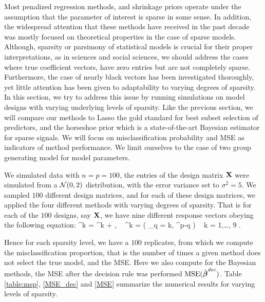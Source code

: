 \documentclass[ba]{imsart}
\begin{document}
Most penalized regression methods, and shrinkage priors operate under the assumption that the parameter of interest is sparse in some sense. In addition, the widespread attention that these methods have received in the past decade was mostly focused on theoretical properties in the case of sparse models. Although, sparsity or parsimony of statistical models is crucial for their proper interpretations, as in sciences
and social sciences, we should address the cases where true coefficient vectors, have zero entries but are not completely sparse. Furthermore, the case of nearly black vectors has been investigated thoroughly, yet little attention has been given to adaptability to varying degrees of sparsity. In this section, we try to address this issue by running simulations on model designs with varying underlying levels of sparsity. Like the previous section, we will compare our methods to Lasso the gold standard for best subset selection of predictors, and the horseshoe prior which is a state-of-the-art Bayesian estimator for sparse signals. We will focus on misclassification probability and MSE as indicators of method performance. We limit ourselves to the case of two group generating model for model parameters. 

We simulated data with $n = p = 100$, the entries of the design matrix ${\bf X}$ were simulated from a $\mathcal{N}(0 ,2)$ distribution, with the error variance set to $\sigma^2 = 5 $. We sampled $100$ different design matrices, and for each of these design matrices, we applied the four different methods with varying degrees of sparsity. That is for each of the $100$ designs, say ${\bf X}$, we have nine different response vectors obeying the following equation:
\beq\label{sparsity_mod}
\y^{k} = \X \bbeta^{k} + \bepsilon, \  \bbeta^{k} =  ( _{q = k}, ^{p-q} ) \  k = 1,\ldots, 9 .
\eeq

Hence for each sparsity level, we have a $100$ replicates, from which we compute the misclassification proportion, that is the number of times a given method does not select the true model, and the MSE. Here we also compute for the Bayesian methods, the MSE after the decision rule was performed $\textbf{\rm{MSE}}(\hat{\boldsymbol{\beta}}^{dec})$. Table \ref{table:msp}, \ref{MSE_dec} and \ref{MSE} summarize the numerical results for varying levels of sparsity. 
\end{document}
